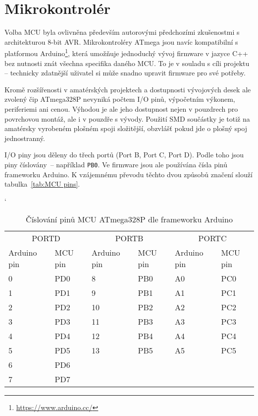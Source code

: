 \section{Mikrokontrolér}
Volba MCU byla ovlivněna především autorovými předchozími zkušenostmi
s architekturou 8-bit AVR. Mikrokontroléry ATmega jsou navíc kompatibilní
s platformou Arduino\footnote{\url{https://www.arduino.cc/}}, která umožňuje
jednoduchý vývoj firmware v jazyce C++ bez nutnosti znát všechna specifika
daného MCU. To je v souladu s cíli projektu -- technicky zdatnější uživatel si
může snadno upravit firmware pro své potřeby.

Kromě rozšířenosti v amatérských projektech a dostupnosti vývojových desek ale
zvolený čip ATmega328P nevyniká počtem I/O pinů, výpočetním výkonem,
periferiemi ani cenou. Výhodou je ale jeho dostupnost nejen v pouzdrech pro
povrchovou montáž, ale i v pouzdře s vývody. Použití SMD součástky je totiž na
amatérsky vyrobeném plošném spoji složitější, obzvlášť pokud jde o plošný spoj
jednostranný.

\nocite{dshATmega328} %

I/O piny jsou děleny do třech portů (Port B, Port C, Port D). Podle toho jsou
piny číslovány~-- například \texttt{PB0}. Ve firmware jsou ale používána čísla
pinů frameworku Arduino. K vzájemnému převodu těchto dvou způsobů značení
slouží tabulka~\vref{tab:MCU pins}.

\begin{table}[htb]
    \centering
    \caption{%
        Číslování pinů MCU ATmega328P dle frameworku Arduino%
    }
    \label{tab:MCU pins}
    \catcode`
    \begin{tabular}{*{3}{ll}}
        \toprule
        \multicolumn{2}{c}{PORTD}
        & \multicolumn{2}{c}{PORTB}
        & \multicolumn{2}{c}{PORTC}
        \\
        \cmidrule(lr){1-2}
        \cmidrule(lr){3-4}
        \cmidrule(lr){5-6}
        Arduino pin     & MCU pin
        & Arduino pin     & MCU pin
        & Arduino pin     & MCU pin
        \\
        \midrule
        0   & PD0   & 8   & PB0   & A0  & PC0 \\
        1   & PD1   & 9   & PB1   & A1  & PC1 \\
        2   & PD2   & 10  & PB2   & A2  & PC2 \\
        3   & PD3   & 11  & PB3   & A3  & PC3 \\
        4   & PD4   & 12  & PB4   & A4  & PC4 \\
        5   & PD5   & 13  & PB5   & A5  & PC5 \\
        6   & PD6 \\
        7   & PD7 \\
        \bottomrule
    \end{tabular}
\end{table}

